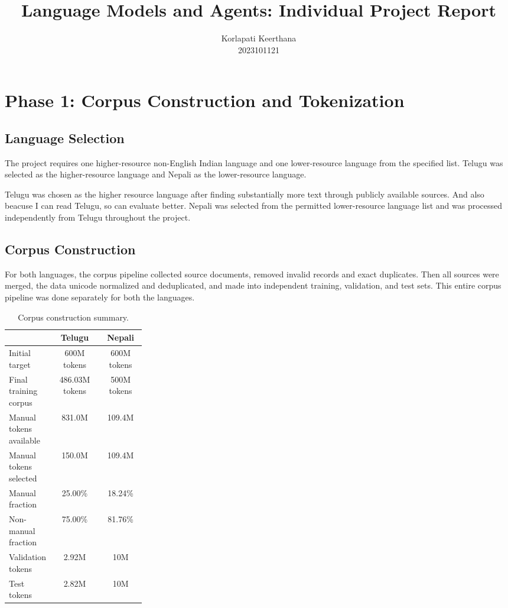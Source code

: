 \documentclass[10pt,a4paper]{article}
\title{
    \vspace{-1.0cm}
    \textbf{Language Models and Agents: Individual Project Report}\\
}
\author{
    Korlapati Keerthana\\
    2023101121
}
\date{}
\begin{document}
\maketitle
\vspace{-0.5cm}

\section{Phase 1: Corpus Construction and Tokenization}

\subsection{Language Selection}

The project requires one higher-resource non-English Indian language
and one lower-resource language from the specified list. Telugu was
selected as the higher-resource language and Nepali as the
lower-resource language.

Telugu was chosen as the higher resource language after finding substantially more text through publicly available sources. And also beacuse I can read Telugu, so can evaluate better. Nepali was selected from the permitted lower-resource language list and was processed independently from Telugu throughout the project.

\subsection{Corpus Construction}

For both languages, the corpus pipeline collected source documents,
removed invalid records and exact duplicates. Then all sources were merged, the data unicode normalized and deduplicated, and made into independent training, validation, and test sets. This entire corpus pipeline was done separately for both the languages.

\begin{table}[H]
\centering
\small
\caption{Corpus construction summary.}
\begin{tabular}{p{0.27\linewidth}cc}
\toprule
 & \textbf{Telugu} & \textbf{Nepali}\\
\midrule
Initial target & 600M tokens & 600M tokens\\
Final training corpus & 486.03M tokens & 500M tokens\\
Manual tokens available & 831.0M & 109.4M\\
Manual tokens selected & 150.0M & 109.4M\\
Manual fraction & 25.00\% & 18.24\%\\
Non-manual fraction & 75.00\% & 81.76\%\\
Validation tokens & 2.92M & 10M\\
Test tokens & 2.82M & 10M\\
\bottomrule
\end{tabular}
\end{table}
\end{document}
